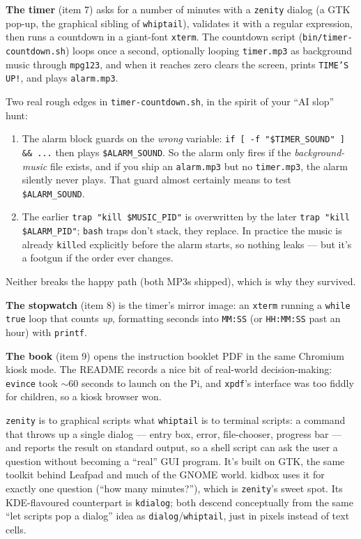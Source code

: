 \documentclass[11pt,oneside]{article}
\newcommand{\code}[1]{\texorpdfstring{\textcolor{kbblue}{\texttt{#1}}}{#1}}
\newcommand{\file}[1]{\textcolor{kbteal}{\texttt{#1}}}
\begin{document}
\textbf{The timer} (item 7) asks for a number of minutes with a \texttt{zenity}
dialog (a GTK pop-up, the graphical sibling of \texttt{whiptail}), validates it
with a regular expression, then runs a countdown in a giant-font \texttt{xterm}.
The countdown script (\file{bin/timer-countdown.sh}) loops once a second,
optionally looping \file{timer.mp3} as background music through \texttt{mpg123},
and when it reaches zero clears the screen, prints \code{TIME'S UP!}, and plays
\file{alarm.mp3}.

\begin{fieldnote}
Two real rough edges in \file{timer-countdown.sh}, in the spirit of your ``AI
slop'' hunt:
\begin{enumerate}
\item The alarm block guards on the \emph{wrong} variable:
\code{if [ -f "\$TIMER\_SOUND" ] \&\& ...} then plays \code{\$ALARM\_SOUND}. So
the alarm only fires if the \emph{background-music} file exists, and if you ship
an \texttt{alarm.mp3} but no \texttt{timer.mp3}, the alarm silently never plays.
That guard almost certainly means to test \code{\$ALARM\_SOUND}.
\item The earlier \code{trap "kill \$MUSIC\_PID"} is overwritten by the later
\code{trap "kill \$ALARM\_PID"}; \texttt{bash} traps don't stack, they replace.
In practice the music is already \texttt{kill}ed explicitly before the alarm
starts, so nothing leaks --- but it's a footgun if the order ever changes.
\end{enumerate}
Neither breaks the happy path (both MP3s shipped), which is why they survived.
\end{fieldnote}

\textbf{The stopwatch} (item 8) is the timer's mirror image: an \texttt{xterm}
running a \code{while true} loop that counts \emph{up}, formatting seconds into
\code{MM:SS} (or \code{HH:MM:SS} past an hour) with \texttt{printf}.

\textbf{The book} (item 9) opens the instruction booklet PDF in the same
Chromium kiosk mode. The README records a nice bit of real-world decision-making:
\texttt{evince} took $\sim$60 seconds to launch on the Pi, and \texttt{xpdf}'s
interface was too fiddly for children, so a kiosk browser won.

\begin{deeper}
\texttt{zenity} is to graphical scripts what \texttt{whiptail} is to terminal
scripts: a command that throws up a single dialog --- entry box, error,
file-chooser, progress bar --- and reports the result on standard output, so a
shell script can ask the user a question without becoming a ``real'' GUI program.
It's built on GTK, the same toolkit behind Leafpad and much of the GNOME world.
kidbox uses it for exactly one question (``how many minutes?''), which is
\texttt{zenity}'s sweet spot. Its KDE-flavoured counterpart is
\texttt{kdialog}; both descend conceptually from the same ``let scripts pop a
dialog'' idea as \texttt{dialog}/\texttt{whiptail}, just in pixels instead of
text cells.
\end{deeper}
\end{document}
